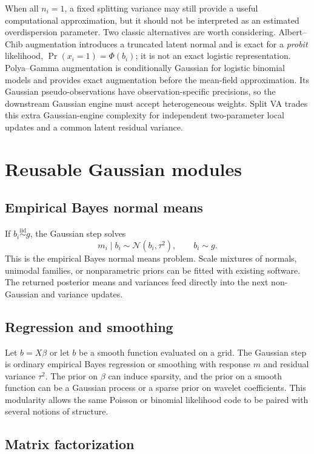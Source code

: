\documentclass[11pt]{article}
\newcommand{\N}{\mathcal{N}}
\begin{document}
When all $n_i=1$, a fixed splitting variance may still provide a useful
computational approximation, but it should not be interpreted as an estimated
overdispersion parameter. Two classic alternatives are worth considering.
Albert--Chib augmentation introduces a truncated latent normal and is exact
for a \emph{probit} likelihood, $\Pr(x_i=1)=\Phi(b_i)$; it is not an exact
logistic representation. Polya--Gamma augmentation is conditionally Gaussian
for logistic binomial models and provides exact augmentation before the
mean-field approximation. Its Gaussian pseudo-observations have
observation-specific precisions, so the downstream Gaussian engine must accept
heterogeneous weights. Split VA trades this extra Gaussian-engine complexity
for independent two-parameter local updates and a common latent residual
variance.

\section{Reusable Gaussian modules}

\subsection{Empirical Bayes normal means}

If $b_i\overset{\mathrm{iid}}\sim g$, the Gaussian step solves
\[
 m_i\mid b_i\sim\N(b_i,\tau^2),\qquad b_i\sim g.
\]
This is the empirical Bayes normal means problem. Scale mixtures of normals,
unimodal families, or nonparametric priors can be fitted with existing
software. The returned posterior means and variances feed directly into the
next non-Gaussian and variance updates.

\subsection{Regression and smoothing}

Let $b=X\beta$ or let $b$ be a smooth function evaluated on a grid. The
Gaussian step is ordinary empirical Bayes regression or smoothing with
response $m$ and residual variance $\tau^2$. The prior on $\beta$ can induce
sparsity, and the prior on a smooth function can be a Gaussian process or a
sparse prior on wavelet coefficients. This modularity allows the same Poisson
or binomial likelihood code to be paired with several notions of structure.

\subsection{Matrix factorization}
\end{document}
